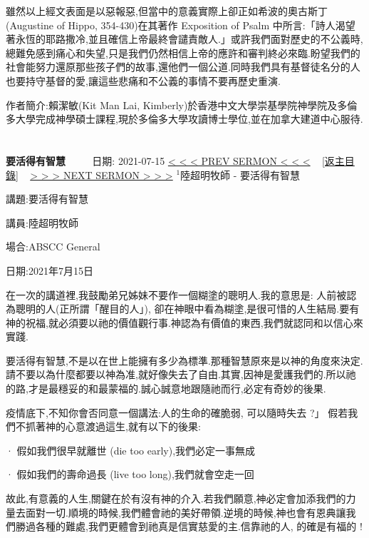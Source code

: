 \documentclass{book}
\begin{document}
雖然以上經文表面是以惡報惡,但當中的意義實際上卻正如希波的奧古斯丁(Augustine of Hippo, 354-430)在其著作 Exposition of Psalm 中所言:「詩人渴望著永恆的耶路撒冷,並且確信上帝最終會譴責敵人.」或許我們面對歷史的不公義時,總難免感到痛心和失望,只是我們仍然相信上帝的應許和審判終必來臨.盼望我們的社會能努力還原那些孩子們的故事,還他們一個公道.同時我們具有基督徒名分的人也要持守基督的愛,讓這些悲痛和不公義的事情不要再歷史重演.

作者簡介:賴潔敏(Kit Man Lai, Kimberly)於香港中文大學崇基學院神學院及多倫多大學完成神學碩士課程,現於多倫多大學攻讀博士學位,並在加拿大建道中心服待.
\newpage



\section{}
\label{sec:2}
\textbf{要活得有智慧}
\newline
\newline
~~~~ 日期: 2021-07-15
\newline
\newline
\hyperref[sec:1]{\small{< < < PREV SERMON < < <}}
~
\hyperref[sec:index]{\small{[返主目錄]}}
~
\hyperref[sec:3]{\small{> > > NEXT SERMON > > >}}
\newline
\newline
$^{1}$陸超明牧師 - 要活得有智慧

講題:要活得有智慧

講員:陸超明牧師

場合:ABSCC General

日期:2021年7月15日

在一次的講道裡,我鼓勵弟兄姊妹不要作一個糊塗的聰明人.我的意思是: 人前被認為聰明的人(正所謂「醒目的人」), 卻在神眼中看為糊塗,是很可惜的人生結局.要有神的祝福,就必須要以祂的價值觀行事.神認為有價值的東西,我們就認同和以信心來實踐.

要活得有智慧,不是以在世上能擁有多少為標準.那種智慧原來是以神的角度來決定.請不要以為什麼都要以神為准,就好像失去了自由.其實,因神是愛護我們的.所以祂的路,才是最穩妥的和最蒙福的.誠心誠意地跟隨祂而行,必定有奇妙的後果.

疫情底下,不知你會否同意一個講法:人的生命的確脆弱, 可以隨時失去 ?」 假若我們不抓著神的心意渡過這生,就有以下的後果:

· 假如我們很早就離世 (die too early),我們必定一事無成

· 假如我們的壽命過長 (live too long),我們就會空走一回

故此,有意義的人生,關鍵在於有沒有神的介入.若我們願意,神必定會加添我們的力量去面對一切.順境的時候,我們體會祂的美好帶領.逆境的時候,神也會有恩典讓我們勝過各種的難處,我們更體會到祂真是信實慈愛的主.信靠祂的人, 的確是有福的 !
\end{document}
